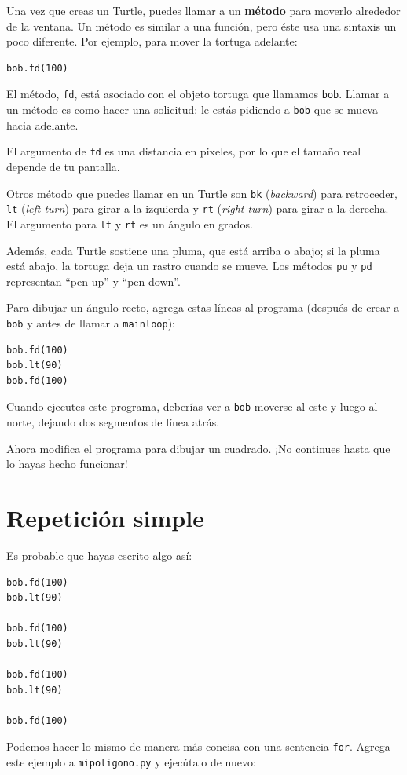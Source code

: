 \documentclass[10pt]{book}
\begin{document}
Una vez que creas un Turtle, puedes llamar a un {\bf método} para moverlo
alrededor de la ventana.  Un método es similar a una función, pero
éste usa una sintaxis un poco diferente.  Por ejemplo, para mover la tortuga
adelante:

\begin{verbatim}
bob.fd(100)
\end{verbatim}
%
El método, {\tt fd}, está asociado con el objeto
tortuga que llamamos {\tt bob}.
Llamar a un método es como hacer una solicitud: le estás pidiendo a {\tt bob}
que se mueva hacia adelante.

El argumento de {\tt fd} es una distancia en pixeles, por lo que el tamaño
real depende de tu pantalla.

Otros método que puedes llamar en un Turtle son {\tt bk} ({\em backward}) para
retroceder, {\tt lt} ({\em left turn}) para girar a la izquierda y {\tt rt} ({\em right turn}) para girar a la derecha.  El
argumento para {\tt lt} y {\tt rt} es un ángulo en grados.

Además, cada Turtle sostiene una pluma, que está
arriba o abajo; si la pluma está abajo, la tortuga deja
un rastro cuando se mueve.  Los métodos {\tt pu} y {\tt pd}
representan ``pen up'' y ``pen down''.

Para dibujar un ángulo recto, agrega estas líneas al programa
(después de crear a {\tt bob} y antes de llamar a \verb"mainloop"):

\begin{verbatim}
bob.fd(100)
bob.lt(90)
bob.fd(100)
\end{verbatim}
%
Cuando ejecutes este programa, deberías ver a {\tt bob} moverse al este y luego
al norte, dejando dos segmentos de línea atrás.

Ahora modifica el programa para dibujar un cuadrado.  ¡No continues hasta que
lo hayas hecho funcionar!


\section{Repetición simple}
\label{repetition}

Es probable que hayas escrito algo así:

\begin{verbatim}
bob.fd(100)
bob.lt(90)

bob.fd(100)
bob.lt(90)

bob.fd(100)
bob.lt(90)

bob.fd(100)
\end{verbatim}
%
Podemos hacer lo mismo de manera más concisa con una sentencia {\tt for}.
Agrega este ejemplo a {\tt mipoligono.py} y ejecútalo de nuevo:
\end{document}
